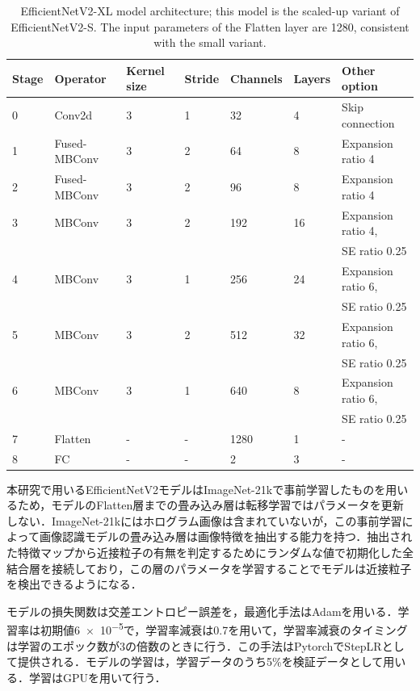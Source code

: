 \begin{table}[H]
    \centering
    \caption{EfficientNetV2-XL model architecture; this model is the scaled-up variant of EfficientNetV2-S. The input parameters of the Flatten layer are 1280, consistent with the small variant.}
    \label{table:EffNetV2-XL}
    \begin{tabular}{lllllll}
    Stage & Operator & Kernel size & Stride & Channels & Layers & Other option \\ \hline \hline
    0 & Conv2d & 3 & 1 & 32 & 4 & Skip connection \\ \hline
    1 & Fused-MBConv & 3 & 2 & 64 & 8 & Expansion ratio 4 \\ \hline
    2 & Fused-MBConv & 3 & 2 & 96 & 8 & Expansion ratio 4 \\ \hline
    3 & MBConv & 3 & 2 & 192 & 16 & Expansion ratio 4, \\ &&&&&& SE ratio 0.25  \\ \hline
    4 & MBConv & 3 & 1 & 256 & 24 & Expansion ratio 6, \\ &&&&&& SE ratio 0.25  \\ \hline
    5 & MBConv & 3 & 2 & 512 & 32 & Expansion ratio 6, \\ &&&&&& SE ratio 0.25  \\ \hline
    6 & MBConv & 3 & 1 & 640 & 8 & Expansion ratio 6, \\ &&&&&& SE ratio 0.25  \\ \hline
    7 & Flatten & - & - & 1280 & 1 & - \\ \hline
    8 & FC & - & - & 2 & 3 & - \\ \hline
    \end{tabular}
\end{table}
\newpage

本研究で用いるEfficientNetV2モデルはImageNet-21k\cite{krizhevsky2012}で事前学習したものを用いるため，モデルのFlatten層までの畳み込み層は転移学習ではパラメータを更新しない．ImageNet-21kにはホログラム画像は含まれていないが，この事前学習によって画像認識モデルの畳み込み層は画像特徴を抽出する能力を持つ．抽出された特徴マップから近接粒子の有無を判定するためにランダムな値で初期化した全結合層を接続しており，この層のパラメータを学習することでモデルは近接粒子を検出できるようになる．

モデルの損失関数は交差エントロピー誤差\cite{bishop2006}を，最適化手法はAdam\cite{kingma2015}を用いる．学習率は初期値\num{6e-5}で，学習率減衰は\num{0.7}を用いて，学習率減衰のタイミングは学習のエポック数が\num{3}の倍数のときに行う．この手法はPytorchでStepLRとして提供される．モデルの学習は，学習データのうち\num{5}\%を検証データとして用いる．学習はGPUを用いて行う．

